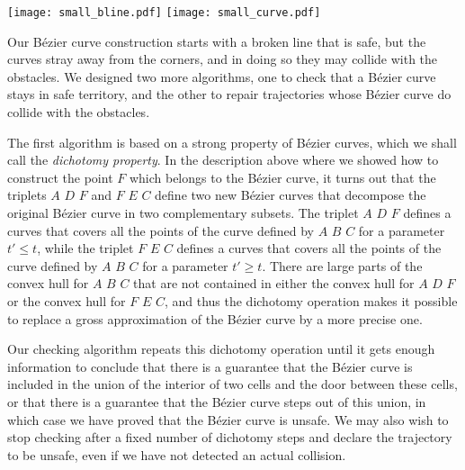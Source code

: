 \documentclass{easychair}
\begin{document}
\begin{center}
\texttt{[image: small\_bline.pdf]}
\texttt{[image: small\_curve.pdf]}
\end{center}

Our Bézier curve construction starts with a broken line that is safe,
but the curves stray away from the corners, and in doing so they may
collide with the obstacles.  We designed two more algorithms, one to check
that a Bézier curve stays in safe territory, and the other to repair
trajectories whose Bézier curve do collide with the obstacles.

The first algorithm is based on a strong property of Bézier curves,
which we shall call the {\em dichotomy property}.  In the description above
where we showed how to construct the point \(F\) which belongs to
the Bézier curve, it turns out that the triplets \(A\) \(D\) \(F\) and
\(F\) \(E\) \(C\) define two new Bézier curves that decompose the
original Bézier curve in two complementary subsets.  The triplet
\(A\) \(D\) \(F\) defines a curves that
covers all the points of the curve defined by \(A\) \(B\) \(C\)
for a parameter \(t' \leq t\), while the triplet \(F\) \(E\) \(C\) 
defines a curves that covers all the points of the curve defined
by \(A\) \(B\) \(C\) for a parameter \(t'\geq t\).  There are large
parts of the convex hull for \(A\) \(B\) \(C\) that are not contained in
either the convex hull for \(A\) \(D\) \(F\) or the convex hull for
\(F\) \(E\) \(C\),
and thus the dichotomy operation makes it possible to replace a gross
approximation of the Bézier curve by a more precise one.

Our checking
algorithm repeats this dichotomy operation until it gets enough
information to conclude that there is a guarantee that the Bézier curve
is included in the union of the interior of two cells and the door
between these cells, or that there is a guarantee that the Bézier curve
steps out of this union, in which case we have proved that the Bézier
curve is unsafe.  We may also wish to stop checking after a fixed number
of dichotomy steps and declare the trajectory to be unsafe, even if we have
not detected an actual collision.
\end{document}
